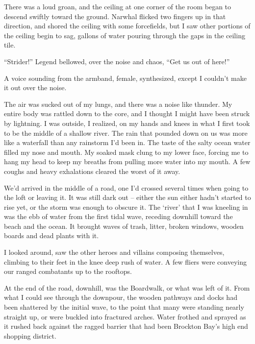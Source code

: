 There was a loud groan, and the ceiling at one corner of the room began to descend swiftly toward the ground.  Narwhal flicked two fingers up in that direction, and shored the ceiling with some forcefields, but I saw other portions of the ceiling begin to sag, gallons of water pouring through the gaps in the ceiling tile.



``Strider!'' Legend bellowed, over the noise and chaos, ``Get us out of here!''



A voice sounding from the armband, female, synthesized, except I couldn't make it out over the noise.



The air was sucked out of my lungs, and there was a noise like thunder.  My entire body was rattled down to the core, and I thought I might have been struck by lightning.  I was outside, I realized, on my hands and knees in what I first took to be the middle of a shallow river.  The rain that pounded down on us was more like a waterfall than any rainstorm I'd been in.  The taste of the salty ocean water filled my nose and mouth.  My soaked mask clung to my lower face, forcing me to hang my head to keep my breaths from pulling more water into my mouth.  A few coughs and heavy exhalations cleared the worst of it away.



We'd arrived in the middle of a road, one I'd crossed several times when going to the loft or leaving it.  It was still dark out – either the sun either hadn't started to rise yet, or the storm was enough to obscure it.  The `river' that I was kneeling in was the ebb of water from the first tidal wave, receding downhill toward the beach and the ocean.  It brought waves of trash, litter, broken windows, wooden boards and dead plants with it.



I looked around, saw the other heroes and villains composing themselves, climbing to their feet in the knee deep rush of water.  A few fliers were conveying our ranged combatants up to the rooftops.



At the end of the road, downhill, was the Boardwalk, or what was left of it.  From what I could see through the downpour, the wooden pathways and docks had been shattered by the initial wave, to the point that many were standing nearly straight up, or were buckled into fractured arches.  Water frothed and sprayed as it rushed back against the ragged barrier that had been Brockton Bay's high end shopping district.



